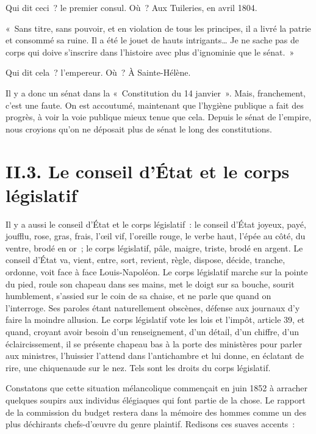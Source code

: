 \documentclass[french,twoside]{book} %
\newenvironment{quoteblock}%
  {\begin{quoting}}
  {\end{quoting}}
\newenvironment{quotebar}{%
    \def\FrameCommand{{\color{rubric!10!}\vrule width 0.5em} \hspace{0.9em}}%
    \def\OuterFrameSep{0pt} %
    \MakeFramed {\advance\hsize-\width \FrameRestore}
  }%
  {%
    \endMakeFramed
  }
\renewenvironment{quoteblock}%
  {%
    \savenotes
    \setstretch{0.9}
    \begin{quotebar}
    \smallskip
  }
  {%
    \smallskip
    \end{quotebar}
    \spewnotes
  }
\begin{document}
Qui dit ceci ? le premier consul. Où ? Aux Tuileries, en avril 1804.\par

\begin{quoteblock}
 \noindent « Sans titre, sans pouvoir, et en violation de tous les principes, il a livré la patrie et consommé sa ruine. Il a été le jouet de hauts intrigants… Je ne sache pas de corps qui doive s’inscrire dans l’histoire avec plus d’ignominie que le sénat. »
 \end{quoteblock}

Qui dit cela ? l’empereur. Où ? À Sainte-Hélène.\par
Il y a donc un sénat dans la « Constitution du 14 janvier ». Mais, franchement, c’est une faute. On est accoutumé, maintenant que l’hygiène publique a fait des progrès, à voir la voie publique mieux tenue que cela. Depuis le sénat de l’empire, nous croyions qu’on ne déposait plus de sénat le long des constitutions.

\section[{II.3. Le conseil d’État et le corps législatif}]{II.3. Le conseil d’État et le corps législatif}

\noindent Il y a aussi le conseil d’État et le corps législatif : le conseil d’État joyeux, payé, joufflu, rose, gras, frais, l’œil vif, l’oreille rouge, le verbe haut, l’épée au côté, du ventre, brodé en or ; le corps législatif, pâle, maigre, triste, brodé en argent. Le conseil d’État va, vient, entre, sort, revient, règle, dispose, décide, tranche, ordonne, voit face à face Louis-Napoléon. Le corps législatif marche sur la pointe du pied, roule son chapeau dans ses mains, met le doigt sur sa bouche, sourit humblement, s’assied sur le coin de sa chaise, et ne parle que quand on l’interroge. Ses paroles étant naturellement obscènes, défense aux journaux d’y faire la moindre allusion. Le corps législatif vote les lois et l’impôt, article 39, et quand, croyant avoir besoin d’un renseignement, d’un détail, d’un chiffre, d’un éclaircissement, il se présente chapeau bas à la porte des ministères pour parler aux ministres, l’huissier l’attend dans l’antichambre et lui donne, en éclatant de rire, une chiquenaude sur le nez. Tels sont les droits du corps législatif.\par
Constatons que cette situation mélancolique commençait en juin 1852 à arracher quelques soupirs aux individus élégiaques qui font partie de la chose. Le rapport de la commission du budget restera dans la mémoire des hommes comme un des plus déchirants chefs-d’œuvre du genre plaintif. Redisons ces suaves accents :\par
\end{document}

